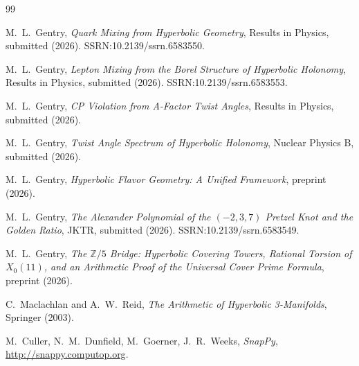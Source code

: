 \documentclass[12pt]{article}
\theoremstyle{definition}
\newcommand{\Z}{\mathbb{Z}}
\begin{document}
\begin{thebibliography}{99}

M.~L.~Gentry,
\textit{Quark Mixing from Hyperbolic Geometry},
Results in Physics, submitted (2026). SSRN:10.2139/ssrn.6583550.

M.~L.~Gentry,
\textit{Lepton Mixing from the Borel Structure of Hyperbolic Holonomy},
Results in Physics, submitted (2026). SSRN:10.2139/ssrn.6583553.

M.~L.~Gentry,
\textit{CP Violation from A-Factor Twist Angles},
Results in Physics, submitted (2026).

M.~L.~Gentry,
\textit{Twist Angle Spectrum of Hyperbolic Holonomy},
Nuclear Physics B, submitted (2026).

M.~L.~Gentry,
\textit{Hyperbolic Flavor Geometry: A Unified Framework},
preprint (2026).

M.~L.~Gentry,
\textit{The Alexander Polynomial of the $(-2,3,7)$ Pretzel Knot
and the Golden Ratio}, JKTR, submitted (2026).
SSRN:10.2139/ssrn.6583549.

M.~L.~Gentry,
\textit{The $\Z/5$ Bridge: Hyperbolic Covering Towers, Rational
Torsion of $X_0(11)$, and an Arithmetic Proof of the Universal Cover
Prime Formula}, preprint (2026).

C.~Maclachlan and A.~W.~Reid,
\textit{The Arithmetic of Hyperbolic 3-Manifolds},
Springer (2003).

M.~Culler, N.~M.~Dunfield, M.~Goerner, J.~R.~Weeks,
\textit{SnapPy}, \url{http://snappy.computop.org}.

\end{thebibliography}
\end{document}
